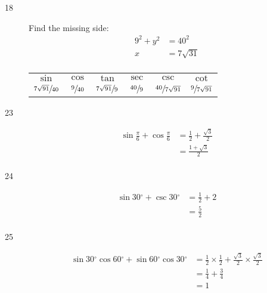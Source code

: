 \documentclass{exam}
\newcommand{\dg}{\ensuremath{^\circ}}
\begin{document}
\begin{description}
      \item[18] 
        Find the missing side:
        \begin{align*}
          9^2 + y^2 & = 40^2 \\
          x         & = 7 \sqrt{31} \\
        \end{align*}

        \begin{tabular}[H]{cccccc}
          \toprule
          $\sin$                    & $\cos$          & $\tan$                   & $\sec$          & $\csc$                    & $\cot$ \\
          $\sfrac{7 \sqrt{91}}{40}$ & $\sfrac{9}{40}$ & $\sfrac{7 \sqrt{91}}{9}$ & $\sfrac{40}{9}$ & $\sfrac{40}{7 \sqrt{91}}$ & $\sfrac{9}{7 \sqrt{91}}$ \\
          \bottomrule
        \end{tabular}

      \item[23]
        \begin{align*}
          \sin \frac{\pi}{6} + \cos \frac{\pi}{6} & = \frac{1}{2} + \frac{\sqrt{3}}{2} \\
                                                  & = \boxed{ \frac{1 + \sqrt{3}}{2} } \\
        \end{align*}

      \item[24]
        \begin{align*}
          \sin 30 \dg + \csc 30 \dg & = \frac{1}{2} + 2 \\
                                            & = \boxed{ \frac{5}{2} } \\
        \end{align*}

      \item[25]
        \begin{align*}
          \sin 30 \dg \cos 60 \dg + \sin 60 \dg \cos 30 \dg               & =
            \frac{1}{2} \times \frac{1}{2} + \frac{\sqrt{3}}{2} \times \frac{\sqrt{3}}{2} \\
                                                                                          & = \frac{1}{4} + \frac{3}{4} \\
                                                                                          &= \boxed{ 1 } \\
        \end{align*}


\end{description}
\end{document}
